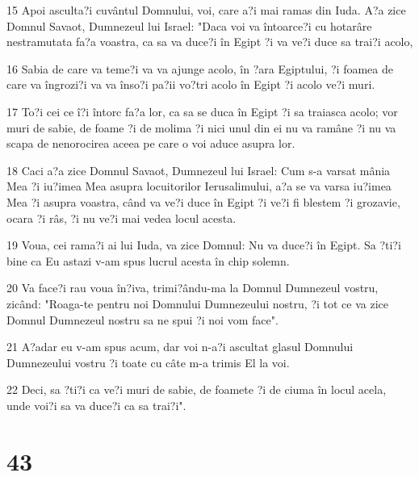 \par 15 Apoi asculta?i cuvântul Domnului, voi, care a?i mai ramas din Iuda. A?a zice Domnul Savaot, Dumnezeul lui Israel: "Daca voi va întoarce?i cu hotarâre nestramutata fa?a voastra, ca sa va duce?i în Egipt ?i va ve?i duce sa trai?i acolo,
\par 16 Sabia de care va teme?i va va ajunge acolo, în ?ara Egiptului, ?i foamea de care va îngrozi?i va va înso?i pa?ii vo?tri acolo în Egipt ?i acolo ve?i muri.
\par 17 To?i cei ce î?i întorc fa?a lor, ca sa se duca în Egipt ?i sa traiasca acolo; vor muri de sabie, de foame ?i de molima ?i nici unul din ei nu va ramâne ?i nu va scapa de nenorocirea aceea pe care o voi aduce asupra lor.
\par 18 Caci a?a zice Domnul Savaot, Dumnezeul lui Israel: Cum s-a varsat mânia Mea ?i iu?imea Mea asupra locuitorilor Ierusalimului, a?a se va varsa iu?imea Mea ?i asupra voastra, când va ve?i duce în Egipt ?i ve?i fi blestem ?i grozavie, ocara ?i râs, ?i nu ve?i mai vedea locul acesta.
\par 19 Voua, cei rama?i ai lui Iuda, va zice Domnul: Nu va duce?i în Egipt. Sa ?ti?i bine ca Eu astazi v-am spus lucrul acesta în chip solemn.
\par 20 Va face?i rau voua în?iva, trimi?ându-ma la Domnul Dumnezeul vostru, zicând: "Roaga-te pentru noi Domnului Dumnezeului nostru, ?i tot ce va zice Domnul Dumnezeul nostru sa ne spui ?i noi vom face".
\par 21 A?adar eu v-am spus acum, dar voi n-a?i ascultat glasul Domnului Dumnezeului vostru ?i toate cu câte m-a trimis El la voi.
\par 22 Deci, sa ?ti?i ca ve?i muri de sabie, de foamete ?i de ciuma în locul acela, unde voi?i sa va duce?i ca sa trai?i".

\chapter{43}

